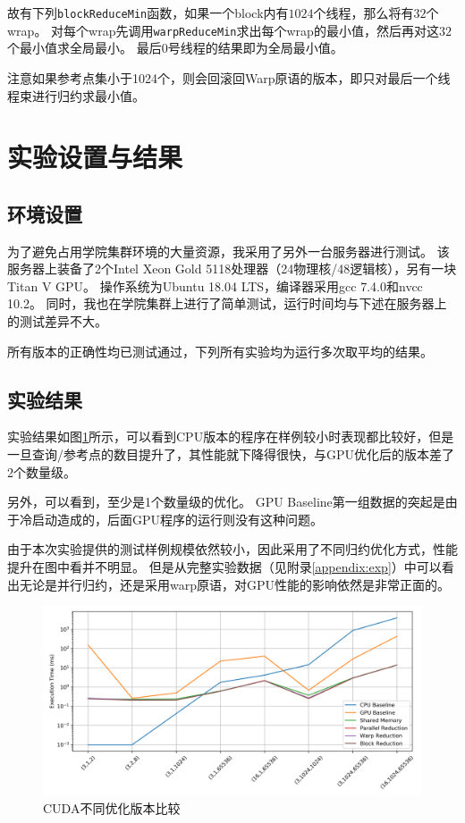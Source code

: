 \documentclass[logo,reportComp]{thesis}
\def\sharedmem{\textcolor{red}{\kaiti 共享内存}}
\begin{document}
故有下列\verb'blockReduceMin'函数，如果一个block内有$1024$个线程，那么将有$32$个wrap。
对每个wrap先调用\verb'warpReduceMin'求出每个wrap的最小值，然后再对这$32$个最小值求全局最小。
最后0号线程的结果即为全局最小值。


注意如果参考点集小于1024个，则会回滚回Warp原语的版本，即只对最后一个线程束进行归约求最小值。

\section{实验设置与结果}
\label{sec:exp}
\subsection{环境设置}
为了避免占用学院集群环境的大量资源，我采用了另外一台服务器进行测试。
该服务器上装备了2个Intel Xeon Gold 5118处理器（24物理核/48逻辑核），另有一块Titan V GPU。
操作系统为Ubuntu 18.04 LTS，编译器采用gcc 7.4.0和nvcc 10.2。
同时，我也在学院集群上进行了简单测试，运行时间均与下述在服务器上的测试差异不大。

所有版本的正确性均已测试通过，下列所有实验均为运行多次取平均的结果。

\subsection{实验结果}
\label{sub:exp}
实验结果如图\ref{fig:cuda}所示，可以看到CPU版本的程序在样例较小时表现都比较好，但是一旦查询/参考点的数目提升了，其性能就下降得很快，与GPU优化后的版本差了2个数量级。

另外，可以看到，至少是1个数量级的优化。
GPU Baseline第一组数据的突起是由于冷启动造成的，后面GPU程序的运行则没有这种问题。

由于本次实验提供的测试样例规模依然较小，因此采用了不同归约优化方式，性能提升在图中看并不明显。
但是从完整实验数据（见附录\ref{appendix:exp}）中可以看出无论是并行归约，还是采用warp原语，对GPU性能的影响依然是非常正面的。

\begin{figure}[H]
\centering
\includegraphics[width=\linewidth]{fig/cuda.png}
\caption{CUDA不同优化版本比较}
\label{fig:cuda}
\end{figure}
\end{document}
